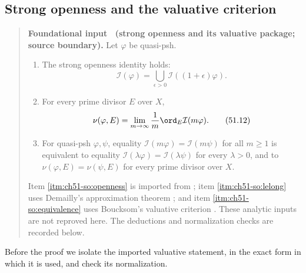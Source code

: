 \subsection{Strong openness and the valuative criterion}
\label{sec:ch51-openness}

\label{thm:complex-strong-openness}
\begin{quote}
\textbf{Foundational input \thetheorem\ (strong openness and its
valuative package; source boundary).}
Let $\varphi$ be quasi-psh.
\begin{enumerate}
\item\label{itm:ch51-so:openness} The strong openness identity holds:
      \[
      \mathcal I(\varphi)
       =\bigcup_{\epsilon>0}\mathcal I((1+\epsilon)\varphi).
      \tag{51.11}\label{eq:complex-strong-openness}
      \]
\item\label{itm:ch51-so:lelong} For every prime divisor $E$ over $X$,
      \[
      \nu(\varphi,E)
       =\lim_{m\to\infty}\frac1m
                    \ord_E\mathcal I(m\varphi).
      \tag{51.12}\label{eq:complex-lelong-from-ideals}
      \]
\item\label{itm:ch51-so:equivalence} For quasi-psh $\varphi,\psi$, equality
      $\mathcal I(m\varphi)=\mathcal I(m\psi)$ for all
      $m\geq1$ is equivalent to equality
      $\mathcal I(\lambda\varphi)=\mathcal I(\lambda\psi)$ for
      every $\lambda>0$, and to
      $\nu(\varphi,E)=\nu(\psi,E)$ for every prime divisor over $X$.
\end{enumerate}
\par
Item \cref{itm:ch51-so:openness} is imported from
\cite[Theorem~1.1]{GZ15}; item \cref{itm:ch51-so:lelong} uses Demailly's
approximation theorem \cite{Dem92reg}; and item
\cref{itm:ch51-so:equivalence} uses Boucksom's valuative criterion
\cite[Corollary~10.18]{Bou17}.  These analytic inputs are not reproved
here.  The deductions and normalization checks are recorded below.
\end{quote}

Before the proof we isolate the imported valuative statement, in the exact
form in which it is used, and check its normalization.

